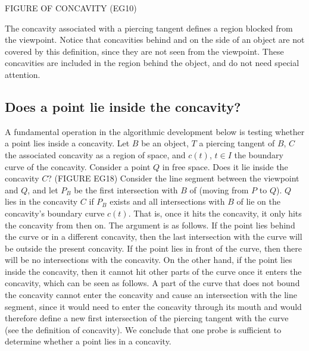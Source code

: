 \documentclass[12pt]{article}
\begin{document}
FIGURE OF CONCAVITY (EG10)

The concavity associated with a piercing tangent defines a region blocked from the
viewpoint.
Notice that concavities behind and on the side of an object are not covered
by this definition, since they are not seen from the viewpoint.
These concavities are included in the region behind the object, and do
not need special attention.

\subsection{Does a point lie inside the concavity?}
\label{sec:ptinconcavity}

A fundamental operation in the algorithmic development below
is testing whether a point lies inside a concavity.
Let $B$ be an object, $T$ a piercing tangent of $B$, $C$ the associated concavity as a region
of space, and $c(t)$, $t \in I$ the boundary curve of the concavity.
Consider a point $Q$ in free space.  Does it lie inside the concavity $C$? (FIGURE EG18)
Consider the line segment  between the viewpoint and $Q$,
and let $P_B$ be the first intersection with $B$ of  (moving from $P$ to $Q$).
$Q$ lies in the concavity $C$ if $P_B$ exists and 
all intersections with $B$ of  lie on the concavity's boundary curve $c(t)$.
That is, once it hits the concavity, it only hits the concavity from then on.
The argument is as follows.
If the point lies behind the curve or in a different concavity,
then the last intersection with the curve will be outside the present concavity.
If the point lies in front of the curve, then there will be no intersections with
the concavity.
On the other hand, if the point lies inside the concavity,
then it cannot hit other parts of the curve once it enters the concavity,
which can be seen as follows.
A part of the curve that does not bound the concavity cannot enter the concavity
and cause an intersection with the line segment, since it would need to enter
the concavity through its mouth and would therefore define a new first intersection
of the piercing tangent with the curve (see the definition of concavity).
We conclude that one probe is sufficient to determine whether a point lies in a concavity.

\end{document}
